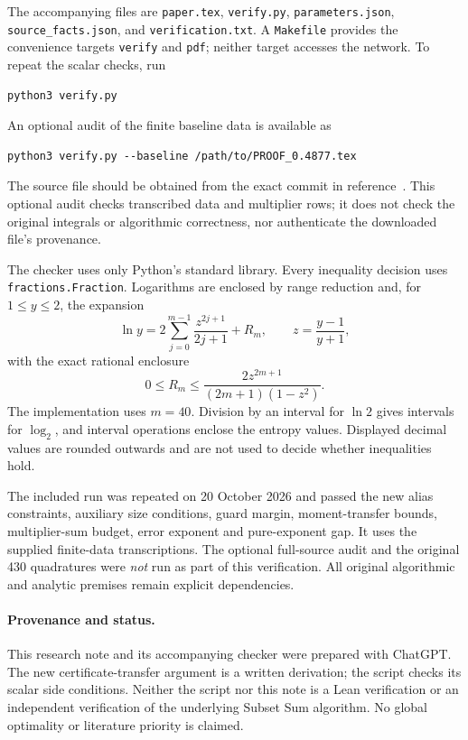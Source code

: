 \documentclass[11pt,a4paper]{article}
\theoremstyle{remark}
\newcommand{\logtwo}{\log_2}
\begin{document}
The accompanying files are \texttt{paper.tex}, \texttt{verify.py},
\texttt{parameters.json}, \texttt{source\_facts.json}, and
\texttt{verification.txt}. A \texttt{Makefile} provides the convenience
targets \texttt{verify} and \texttt{pdf}; neither target accesses the
network. To repeat the scalar checks, run
\begin{Verbatim}[fontsize=\small]
python3 verify.py
\end{Verbatim}
An optional audit of the finite baseline data is available as
\begin{Verbatim}[fontsize=\small]
python3 verify.py --baseline /path/to/PROOF_0.4877.tex
\end{Verbatim}
The source file should be obtained from the exact commit in
reference~\cite{baseline}. This optional audit checks transcribed data
and multiplier rows; it does not check the original integrals or
algorithmic correctness, nor authenticate the downloaded file's
provenance.

The checker uses only Python's standard library. Every inequality
decision uses \texttt{fractions.Fraction}. Logarithms are enclosed by
range reduction and, for $1\le y\le2$, the expansion
\begin{equation}
\label{eq:log-series}
 \ln y=2\sum_{j=0}^{m-1}\frac{z^{2j+1}}{2j+1}+R_m,
 \qquad z=\frac{y-1}{y+1},
\end{equation}
with the exact rational enclosure
\begin{equation}
\label{eq:log-tail}
 0\le R_m\le\frac{2z^{2m+1}}{(2m+1)(1-z^2)}.
\end{equation}
The implementation uses $m=40$. Division by an interval for $\ln2$
gives intervals for $\logtwo$, and interval operations enclose the
entropy values. Displayed decimal values are rounded outwards and are
not used to decide whether inequalities hold.

The included run was repeated on 20 October 2026 and passed the new
alias constraints, auxiliary size conditions, guard margin,
moment-transfer bounds, multiplier-sum budget, error exponent and
pure-exponent gap. It uses the supplied finite-data transcriptions.
The optional full-source audit and the original 430 quadratures were
\emph{not} run as part of this verification. All original algorithmic
and analytic premises remain explicit dependencies.

\paragraph{Provenance and status.}
This research note and its accompanying checker were prepared with
ChatGPT. The new certificate-transfer argument is a written derivation;
the script checks its scalar side conditions. Neither the script nor
this note is a Lean verification or an independent verification of the
underlying Subset Sum algorithm. No global optimality or literature
priority is claimed.
\end{document}
